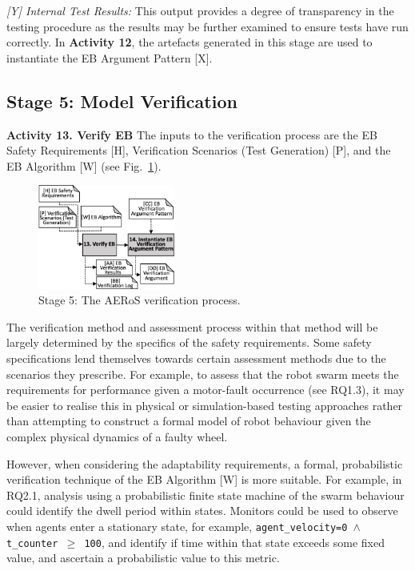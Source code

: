 \documentclass{article}
\begin{document}
\emph{[Y] Internal Test Results:} This output provides a degree of transparency in the testing procedure as the results may be further examined to ensure tests have run correctly. 
In \textbf{Activity 12}, the artefacts generated in this stage are used to instantiate the EB Argument Pattern [X].

\subsection{Stage 5: Model Verification} \label{framework-stage5}
\noindent\textbf{Activity 13. Verify EB} The inputs to the verification process are the EB Safety Requirements [H], Verification Scenarios (Test Generation) [P], and the EB Algorithm [W] (see Fig.~\ref{aeros-stage5}). 
\begin{figure}[!t]
	\centering
	\includegraphics[width=0.4\textwidth]{AERoS-Stage5.pdf}
	\caption{Stage 5: The AERoS verification process.}
	\label{aeros-stage5}
\end{figure}
%
The verification method and assessment process within that method will be largely determined by the specifics of the safety requirements. Some safety specifications lend themselves towards certain assessment methods due to the scenarios they prescribe.
%
For example, to assess that the robot swarm meets the requirements for performance given a motor-fault occurrence (see RQ1.3), it may be easier to realise this in physical or simulation-based testing approaches rather than attempting to construct a formal model of robot behaviour given the complex physical dynamics of a faulty wheel.

%
However, when considering the adaptability requirements, a formal, probabilistic verification technique of the EB Algorithm [W] is more suitable. For example, in RQ2.1, analysis using a probabilistic finite state machine of the swarm behaviour could identify the dwell period within states. Monitors could be used to observe when agents enter a stationary state, for example, \texttt{agent\_velocity=0 $\land $  t\_counter  $\ge$ 100}, and identify if time within that state exceeds some fixed value, and ascertain a probabilistic value to this metric.
\end{document}
